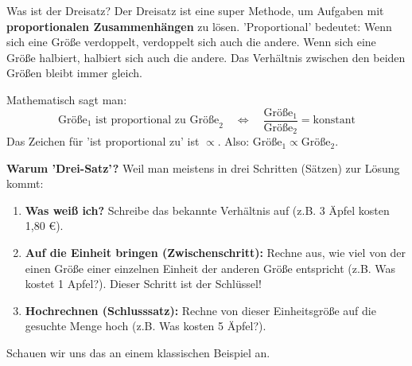 \begin{merksatzumgebung}{Was ist der Dreisatz?}
Der Dreisatz ist eine super Methode, um Aufgaben mit \textbf{proportionalen Zusammenhängen} zu lösen. 'Proportional' bedeutet: Wenn sich eine Größe verdoppelt, verdoppelt sich auch die andere. Wenn sich eine Größe halbiert, halbiert sich auch die andere. Das Verhältnis zwischen den beiden Größen bleibt immer gleich.

Mathematisch sagt man:
\[
\text{Größe}_1 \text{ ist proportional zu Größe}_2 \quad \Leftrightarrow \quad \frac{\text{Größe}_1}{\text{Größe}_2} = \text{konstant}
\]
Das Zeichen für 'ist proportional zu' ist $\propto$. Also: $\text{Größe}_1 \propto \text{Größe}_2$.

\textbf{Warum 'Drei-Satz'?} Weil man meistens in drei Schritten (Sätzen) zur Lösung kommt:
\begin{enumerate}
    \item \textbf{Was weiß ich?} Schreibe das bekannte Verhältnis auf (z.B. 3 Äpfel kosten 1,80 €).
    \item \textbf{Auf die Einheit bringen (Zwischenschritt):} Rechne aus, wie viel von der einen Größe einer einzelnen Einheit der anderen Größe entspricht (z.B. Was kostet 1 Apfel?). Dieser Schritt ist der Schlüssel!
    \item \textbf{Hochrechnen (Schlusssatz):} Rechne von dieser Einheitsgröße auf die gesuchte Menge hoch (z.B. Was kosten 5 Äpfel?).
\end{enumerate}
\end{merksatzumgebung}

Schauen wir uns das an einem klassischen Beispiel an.

